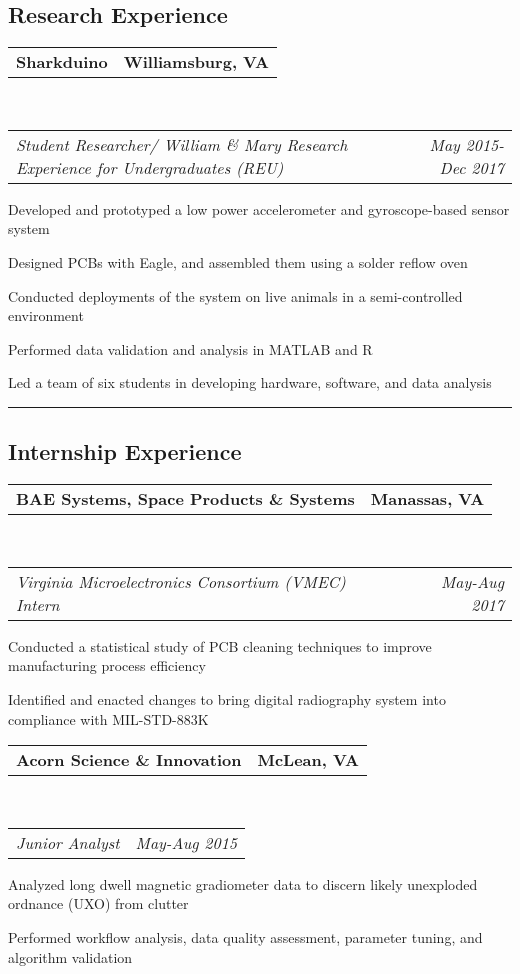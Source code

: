 \documentclass[10pt,letterpaper]{article}
\makeatletter
\newcommand{\headerrow}[2]
{\begin{tabular*}{\linewidth}{l@{\extracolsep{\fill}}r}
	#1 &
	#2 \\
\end{tabular*}}
\makeatother
\begin{document}
\subsection*{Research Experience}

	\headerrow
		{\textbf{Sharkduino}}
		{\textbf{Williamsburg, VA}}
	\\
	\headerrow
		{\emph{Student Researcher/ William \& Mary Research Experience for Undergraduates (REU)}}
		{\emph{May 2015-Dec 2017}}
	\begin{itemize*}
	\item Developed and prototyped a low power accelerometer and gyroscope-based sensor system
	\item Designed PCBs with Eagle, and assembled them using a solder reflow oven
	\item Conducted deployments of the system on live animals in a semi-controlled environment
	\item Performed data validation and analysis in MATLAB and R
	\item Led a team of six students in developing hardware, software, and data analysis
	\end{itemize*}
	
\hrule
\vspace{-0.4em}
\subsection*{Internship Experience}
\headerrow
		{\textbf{BAE Systems, Space Products \& Systems}}
		{\textbf{Manassas, VA}}
	\\
	\headerrow
		{\emph{Virginia Microelectronics Consortium (VMEC) Intern}}
		{\emph{May-Aug 2017}}
\begin{itemize*}
		\item Conducted a statistical study of PCB cleaning techniques to improve manufacturing process efficiency
		\item Identified and enacted changes to bring digital radiography system into compliance with MIL-STD-883K
	\end{itemize*}
	\headerrow
		{\textbf{Acorn Science \& Innovation}}
		{\textbf{McLean, VA}}
	\\
	\headerrow
		{\emph{Junior Analyst}}
		{\emph{May-Aug 2015}}
	\begin{itemize*}
		\item Analyzed long dwell magnetic gradiometer data to
			discern likely unexploded ordnance (UXO) from clutter
		\item Performed workflow analysis, data quality assessment, parameter tuning, and algorithm validation
	\end{itemize*}
	
\end{document}
